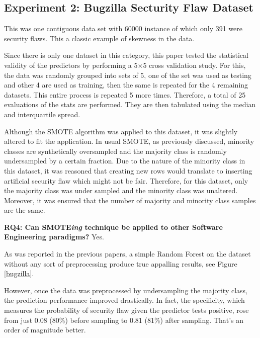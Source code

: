 \documentclass[12pt]{IEEEtran}
\begin{document}
\subsection{Experiment 2: Bugzilla Secturity Flaw Dataset}

This was one contiguous data set with 60000 instance of which only 391 were security flaws. This a classic example of skewness in the data.

Since there is only one dataset in this category, this paper tested the statistical validity of the predictors by performing a 5$\times$5 cross validation study. For this, the data was randomly grouped into sets of 5, one of the set was used as testing and other 4 are used as training, then the same is repeated for the 4 remaining datasets. This entire process is repeated 5 more times. Therefore, a total of 25 evaluations of the stats are performed. They are then tabulated using the median and interquartile spread.

Although the SMOTE algorithm was applied to this dataset, it was slightly altered to fit the application. In usual SMOTE, as previously discussed, minority classes are synthetically oversampled and the majority class is randomly undersampled by a certain fraction. Due to the nature of the minority class in this dataset, it was reasoned that creating new rows would translate to inserting artificial security flaw which might not be fair. Therefore, for this dataset, only the majority class was under sampled and the minority class was unaltered. Moreover, it was ensured that the number of majority and minority class samples are the same.

{{\bfseries RQ4: Can SMOTE\textit{ing} technique be applied to other Software Engineering paradigms?} Yes.}


As was reported in the previous papers, a simple Random Forest on the dataset without any sort of preprocessing produce true appalling results, see Figure \ref{bugzilla}.

However, once the data was preprocessed by undersampling the majority class, the prediction performance improved drastically. In fact, the specificity, which measures the probability of security flaw given the predictor tests positive, rose from just 0.08 (80\%) before sampling to 0.81 (81\%) after sampling. That's an order of magnitude better. 
 
\end{document}
